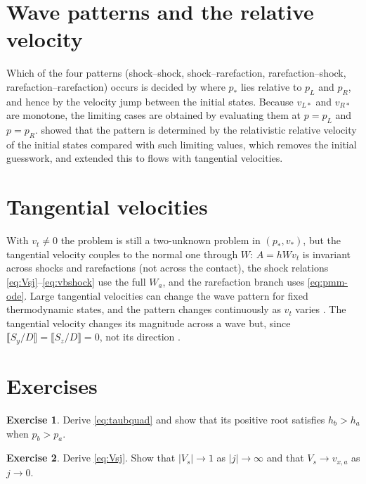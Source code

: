 \documentclass[11pt,a4paper,oneside,openany]{book}
\newcommand{\textcite}{\citet}
\newcommand{\parencite}{\citep}
\theoremstyle{definition}
\newtheorem{exercise}{Exercise}[chapter]
\theoremstyle{plain}
\theoremstyle{remark}
\newcommand{\jump}[1]{\llbracket #1\rrbracket}
\begin{document}
\section{Wave patterns and the relative velocity}

Which of the four patterns (shock--shock, shock--rarefaction, rarefaction--shock,
rarefaction--rarefaction) occurs is decided by where $p_\ast$ lies relative to $p_L$ and
$p_R$, and hence by the velocity jump between the initial states. Because $v_{L\ast}$ and
$v_{R\ast}$ are monotone, the limiting cases are obtained by evaluating them at $p=p_L$ and
$p=p_R$. \textcite{RezzollaZanotti2001} showed that the pattern is determined by the
relativistic relative velocity of the initial states compared with such limiting values,
which removes the initial guesswork, and \textcite{RezzollaZanottiPons2003} extended this to
flows with tangential velocities.

\section{Tangential velocities}

With $v_t\ne0$ the problem is still a two-unknown problem in $(p_\ast,v_\ast)$, but the
tangential velocity couples to the normal one through $W$: $A=hWv_t$ is invariant across
shocks and rarefactions (not across the contact), the shock relations
\eqref{eq:Vsj}--\eqref{eq:vbshock} use the full $W_a$, and the rarefaction branch uses
\eqref{eq:pmm-ode}. Large tangential velocities can change the wave pattern for fixed
thermodynamic states, and the pattern changes continuously as $v_t$ varies
\parencite{Pons2000,RezzollaZanottiPons2003}. The tangential velocity changes its
magnitude across a wave but, since $\jump{S_y/D}=\jump{S_z/D}=0$, not its direction
\parencite[\S5.2]{GiacomazzoRezzolla2006}.

\section*{Exercises}

\begin{exercise}
Derive \eqref{eq:taubquad} and show that its positive root satisfies $h_b>h_a$ when
$p_b>p_a$.
\end{exercise}

\begin{exercise}
Derive \eqref{eq:Vsj}. Show that $|V_s|\to1$ as $|j|\to\infty$ and that $V_s\to v_{x,a}$ as
$j\to0$.
\end{exercise}
\end{document}
